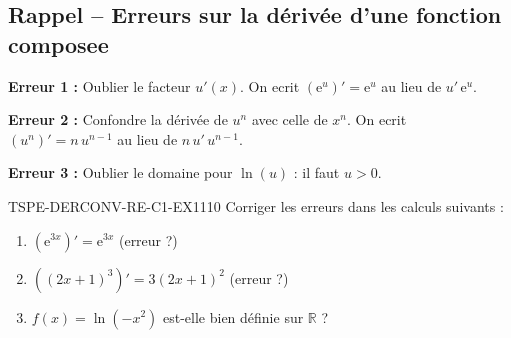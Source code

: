 

\subsection*{Rappel -- Erreurs sur la dérivée d'une fonction composee}

\textbf{Erreur 1 :} Oublier le facteur $u'(x)$. On ecrit $(\mathrm{e}^{u})' = \mathrm{e}^u$ au lieu de $u'\,\mathrm{e}^u$.

\textbf{Erreur 2 :} Confondre la dérivée de $u^n$ avec celle de $x^n$. On ecrit $(u^n)' = n\,u^{n-1}$ au lieu de $n\,u'\,u^{n-1}$.

\textbf{Erreur 3 :} Oublier le domaine pour $\ln(u)$ : il faut $u > 0$.

\begin{exercice}{TSPE-DERCONV-RE-C1-EX1}{1}{10}
Corriger les erreurs dans les calculs suivants :
\begin{enumerate}
  \item $\left(\mathrm{e}^{3x}\right)' = \mathrm{e}^{3x}$ \quad (erreur ?)
  \item $\left((2x+1)^3\right)' = 3(2x+1)^2$ \quad (erreur ?)
  \item $f(x) = \ln(-x^2)$ est-elle bien définie sur $\mathbb{R}$ ?
\end{enumerate}
\end{exercice}


